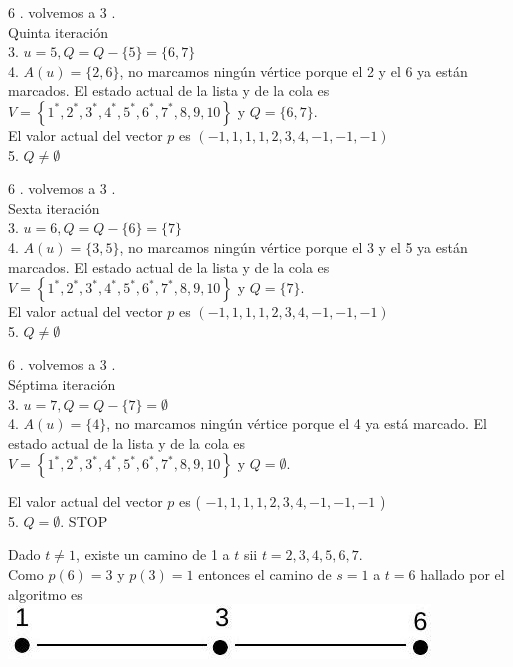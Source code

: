 \documentclass[10pt]{article}
\begin{document}
6 . volvemos a 3 .\\
Quinta iteración\\
3. $u=5, Q=Q-\{5\}=\{6,7\}$\\
4. $A(u)=\{2,6\}$, no marcamos ningún vértice porque el 2 y el 6 ya están marcados. El estado actual de la lista y de la cola es\\
$V=\left\{1^{*}, 2^{*}, 3^{*}, 4^{*}, 5^{*}, 6^{*}, 7^{*}, 8,9,10\right\}$ y $Q=\{6,7\}$.\\
El valor actual del vector $p$ es $(-1,1,1,1,2,3,4,-1,-1,-1)$\\
5. $Q \neq \emptyset$

6 . volvemos a 3 .\\
Sexta iteración\\
3. $u=6, Q=Q-\{6\}=\{7\}$\\
4. $A(u)=\{3,5\}$, no marcamos ningún vértice porque el 3 y el 5 ya están marcados. El estado actual de la lista y de la cola es\\
$V=\left\{1^{*}, 2^{*}, 3^{*}, 4^{*}, 5^{*}, 6^{*}, 7^{*}, 8,9,10\right\}$ y $Q=\{7\}$.\\
El valor actual del vector $p$ es $(-1,1,1,1,2,3,4,-1,-1,-1)$\\
5. $Q \neq \emptyset$

6 . volvemos a 3 .\\
Séptima iteración\\
3. $u=7, Q=Q-\{7\}=\emptyset$\\
4. $A(u)=\{4\}$, no marcamos ningún vértice porque el 4 ya está marcado. El estado actual de la lista y de la cola es\\
$V=\left\{1^{*}, 2^{*}, 3^{*}, 4^{*}, 5^{*}, 6^{*}, 7^{*}, 8,9,10\right\}$ y $Q=\emptyset$.

El valor actual del vector $p$ es ( $-1,1,1,1,2,3,4,-1,-1,-1$ )\\
5. $Q=\emptyset$. STOP

Dado $t \neq 1$, existe un camino de 1 a $t$ sii $t=2,3,4,5,6,7$.\\
Como $p(6)=3$ y $p(3)=1$ entonces el camino de $s=1$ a $t=6$ hallado por el algoritmo es\\
\includegraphics[max width=\textwidth, center]{2025_09_05_93c7c1835f249f70c0eeg-11(1)}
\end{document}

